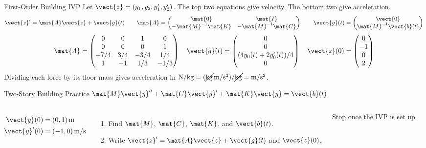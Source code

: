 \documentclass[11pt,aspectratio=169]{beamer}
\begin{document}
\begin{frame}{First-Order Building IVP}
Let $\vect{z}=(y_1,y_2,y_1',y_2')$.
The top two equations give velocity. The bottom two give acceleration.
\[
  \vect{z}'=\mat{A}\vect{z}+\vect{g}(t)
  \qquad
  \mat{A}=\begin{pmatrix}\mat{0}&\mat{I}\\-\mat{M}^{-1}\mat{K}&-\mat{M}^{-1}\mat{C}\end{pmatrix}
  \qquad
  \vect{g}(t)=\begin{pmatrix}\vect{0}\\\mat{M}^{-1}\vect{b}(t)\end{pmatrix}
\]
\[
  \mat{A}=\begin{pmatrix}
    0&0&1&0\\
    0&0&0&1\\
    -7/4&3/4&-3/4&1/4\\
    1&-1&1/3&-1/3
  \end{pmatrix}
  \quad
  \vect{g}(t)=\begin{pmatrix}0\\0\\(4y_0(t)+2y_0'(t))/4\\0\end{pmatrix}
  \quad
  \vect{z}(0)=\begin{pmatrix}0\\-1\\0\\2\end{pmatrix}
\]
Dividing each force by its floor mass gives acceleration in
$\mathrm{N}/\mathrm{kg}=(\cancel{\mathrm{kg}}\,\mathrm{m}/\mathrm{s}^2)/\cancel{\mathrm{kg}}=\mathrm{m}/\mathrm{s}^2$.
\end{frame}

\begin{frame}{Two-Story Building Practice \quad $\mat{M}\vect{y}''+\mat{C}\vect{y}'+\mat{K}\vect{y}=\vect{b}(t)$}
\begin{columns}[c,onlytextwidth]
  \[
    \begin{aligned}
      \vect{y}(0)&=(0,1)\,\mathrm{m}\\
      \vect{y}'(0)&=(-1,0)\,\mathrm{m/s}
    \end{aligned}
  \]
  \begin{enumerate}
    \item Find $\mat{M}$, $\mat{C}$, $\mat{K}$, and $\vect{b}(t)$.
    \item Write $\vect{z}'=\mat{A}\vect{z}+\vect{g}(t)$ and $\vect{z}(0)$.
  \end{enumerate}
  Stop once the IVP is set up.
\end{columns}
\end{frame}
\end{document}
